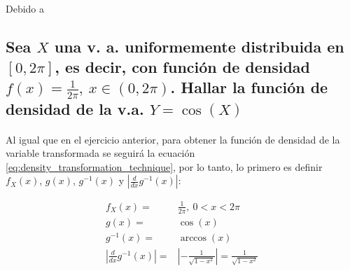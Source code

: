 \documentclass{article}
\begin{document}
    \paragraph{}
    Debido a

  \subsection{Sea $X$ una v. a. uniformemente distribuida en $[0,2\pi]$, es decir, con función de densidad $f(x)=\frac{1}{2\pi}, \ x \in (0,2\pi)$. Hallar la función de densidad de la v.a. $Y = \cos(X)$}

    \paragraph{}
    Al igual que en el ejercicio anterior, para obtener la función de densidad de la variable transformada se seguirá la ecuación \eqref{eq:density_transformation_technique}, por lo tanto, lo primero es definir $f_X(x)$, $g(x)$, $g^{-1}(x)$ y $\left| \frac{d}{dx} g^{-1} (x) \right|$:

    \begin{align}
    \label{eq:e2_1}
      f_X(x) =& \frac{1}{2\pi}, \ 0 < x < 2\pi \\
    \label{eq:e2_2}
      g(x) =& \cos(x) \\
    \label{eq:e2_3}
      g^{-1}(x) =& \arccos(x) \\
    \label{eq:e2_4}
      \left| \frac{d}{dx} g^{-1} (x) \right| =& \left| - \frac{1}{\sqrt{1-x^2}} \right| =  \frac{1}{\sqrt{1-x^2}}
    \end{align}
\end{document}
